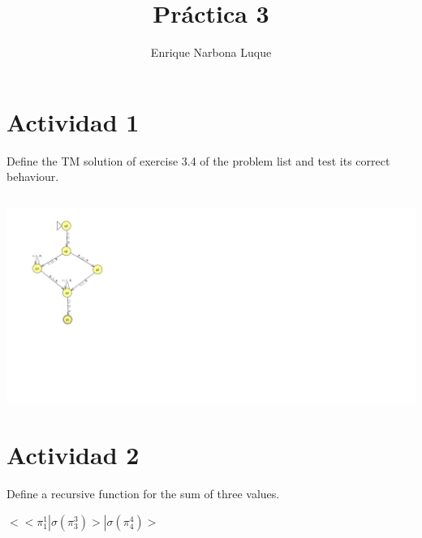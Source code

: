 \documentclass[fleqn, 10pt]{article}
\title{\textbf{Práctica 3}}
\author{Enrique Narbona Luque}
\date{}
\begin{document}
\maketitle
\thispagestyle{empty}

\section*{Actividad 1}
Define the TM solution of exercise 3.4 of the problem list and test its correct
behaviour.


\subsection*{}
\includegraphics[scale=0.5]{MT}

\newpage

\section*{Actividad 2}

Define a recursive function for the sum of three values.

\vspace{4mm}

$<<\pi^1_1|\sigma\left(\pi^3_3\right)>|\sigma\left(\pi^4_4\right)>$

\vspace{3mm}
\end{document}
